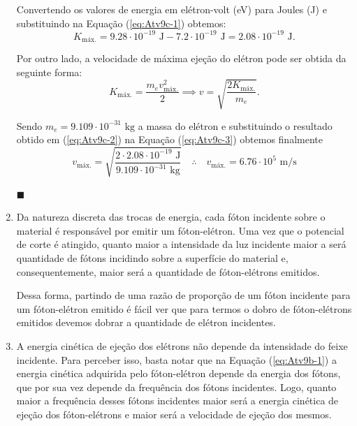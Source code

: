 \documentclass[12pt,a4paper]{article}
\begin{document}
\begin{enumerate}[label = \alph*)]
        Convertendo os valores de energia em elétron-volt (eV) para Joules (J) e substituindo na Equação (\ref{eq:Atv9c-1}) obtemos:
        \begin{equation}\label{eq:Atv9c-2}
            K_{\text{máx.}}=9.28\cdot10^{-19}\text{ J}-7.2\cdot10^{-19}\text{ J}=2.08\cdot10^{-19}\text{ J}.
        \end{equation}

        Por outro lado, a velocidade de máxima ejeção do elétron pode ser obtida da seguinte forma:
        \begin{equation}\label{eq:Atv9c-3}
            K_{\text{máx.}}=\frac{m_e v^2_{\text{máx.}}}{2}\implies v=\sqrt{\frac{2K_{\text{máx.}}}{m_e}}.
        \end{equation}

        Sendo $m_e=9.109\cdot10^{-31}\text{ kg}$ a massa do elétron e substituindo o resultado obtido em (\ref{eq:Atv9c-2}) na Equação (\ref{eq:Atv9c-3}) obtemos finalmente
        \begin{equation}\label{eq:Atv9c-4}
            v_{\text{máx.}}=\sqrt{\frac{2\cdot2.08\cdot10^{-19}\text{ J}}{9.109\cdot10^{-31}\text{ kg}}}\quad\therefore\quad\boxed{v_{\text{máx.}}=6.76\cdot10^{5}\text{ m/s}}
        \end{equation}
        \begin{flushright}
            $\blacksquare$
        \end{flushright}
        

        
        \item Da natureza discreta das trocas de energia, cada fóton incidente sobre o material é responsável por emitir um fóton-elétron. Uma vez que o potencial de corte é atingido, quanto maior a intensidade da luz incidente maior a será quantidade de fótons incidindo sobre a superfície do material e, consequentemente, maior será a quantidade de fóton-elétrons emitidos.

        Dessa forma, partindo de uma razão de proporção de um fóton incidente para um fóton-elétron emitido é fácil ver que para termos o dobro de fóton-elétrons emitidos devemos dobrar a quantidade de elétron incidentes.


        
        \item A energia cinética de ejeção dos elétrons não depende da intensidade do feixe incidente. Para perceber isso, basta notar que na Equação (\ref{eq:Atv9b-1}) a energia cinética adquirida pelo fóton-elétron depende da energia dos fótons, que por sua vez depende da frequência dos fótons incidentes. Logo, quanto maior a frequência desses fótons incidentes maior será a energia cinética de ejeção dos fóton-elétrons e maior será a velocidade de ejeção dos mesmos.
        

\end{enumerate}
\end{document}
